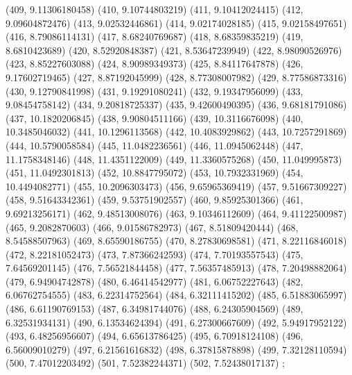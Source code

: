 {					(409, 9.11306180458)
					(410, 9.10744803219)
					(411, 9.10412024415)
					(412, 9.09604872476)
					(413, 9.02532446861)
					(414, 9.02174028185)
					(415, 9.02158497651)
					(416, 8.79086114131)
					(417, 8.68240769687)
					(418, 8.68359835219)
					(419, 8.6810423689)
					(420, 8.52920848387)
					(421, 8.53647239949)
					(422, 8.98090526976)
					(423, 8.85227603088)
					(424, 8.90989349373)
					(425, 8.84117647878)
					(426, 9.17602719465)
					(427, 8.87192045999)
					(428, 8.77308007982)
					(429, 8.77586873316)
					(430, 9.12790841998)
					(431, 9.19291080241)
					(432, 9.19347956099)
					(433, 9.08454758142)
					(434, 9.20818725337)
					(435, 9.42600490395)
					(436, 9.68181791086)
					(437, 10.1820206845)
					(438, 9.90804511166)
					(439, 10.3116676098)
					(440, 10.3485046032)
					(441, 10.1296113568)
					(442, 10.4083929862)
					(443, 10.7257291869)
					(444, 10.5790058584)
					(445, 11.0482236561)
					(446, 11.0945062448)
					(447, 11.1758348146)
					(448, 11.4351122009)
					(449, 11.3360575268)
					(450, 11.049995873)
					(451, 11.0492301813)
					(452, 10.8847795072)
					(453, 10.7932331969)
					(454, 10.4494082771)
					(455, 10.2096303473)
					(456, 9.65965369419)
					(457, 9.51667309227)
					(458, 9.51643342361)
					(459, 9.53751902557)
					(460, 9.85925301366)
					(461, 9.69213256171)
					(462, 9.48513008076)
					(463, 9.10346112609)
					(464, 9.41122500987)
					(465, 9.2082870603)
					(466, 9.01586782973)
					(467, 8.51809420444)
					(468, 8.54588507963)
					(469, 8.65590186755)
					(470, 8.27830698581)
					(471, 8.22116846018)
					(472, 8.22181052473)
					(473, 7.87366242593)
					(474, 7.70193557543)
					(475, 7.64569201145)
					(476, 7.56521844458)
					(477, 7.56357485913)
					(478, 7.20498882064)
					(479, 6.94904742878)
					(480, 6.46414542977)
					(481, 6.06752227643)
					(482, 6.06762754555)
					(483, 6.22314752564)
					(484, 6.32111415202)
					(485, 6.51883065997)
					(486, 6.61190769153)
					(487, 6.34981744076)
					(488, 6.24305904569)
					(489, 6.32531934131)
					(490, 6.13534624394)
					(491, 6.27300667609)
					(492, 5.94917952122)
					(493, 6.48256956607)
					(494, 6.65613786425)
					(495, 6.70918124108)
					(496, 6.56009010279)
					(497, 6.21561616832)
					(498, 6.37815878898)
					(499, 7.32128110594)
					(500, 7.47012203492)
					(501, 7.52382244371)
					(502, 7.52438017137)
				};
